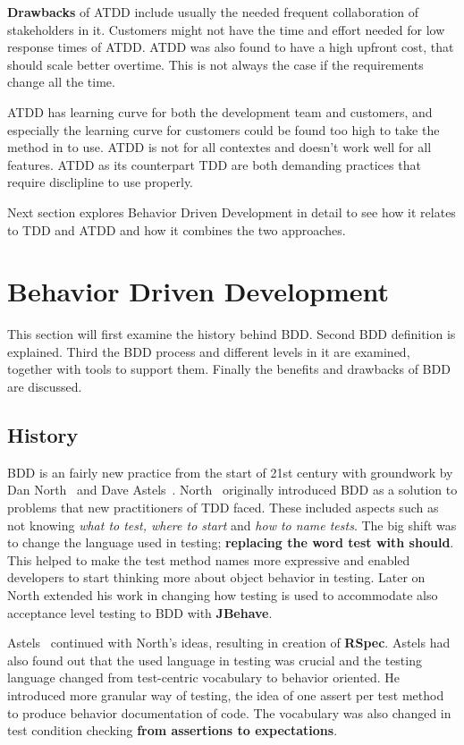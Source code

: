     \textbf{Drawbacks} of ATDD include usually the needed frequent collaboration of stakeholders in it. Customers
    might not have the time and effort needed for low response times of ATDD. ATDD was also found to have a high
    upfront cost, that should scale better overtime. This is not always the case if the requirements change all the time. ~\cite{haugset2012automated}

    ATDD has learning curve for both the development team and customers, and especially the learning curve for customers
    could be found too high to take the method in to use. ATDD is not for all contextes and doesn't work well for all features.
    ATDD as its counterpart TDD are both demanding practices that require
    disclipline to use properly.~\cite{haugset2012automated}

    Next section explores Behavior Driven Development
    in detail to see how it relates to TDD and ATDD and how it combines the two approaches.

\section{Behavior Driven Development} %
    This section will first examine the history behind BDD. Second BDD definition is explained.
    Third the BDD process and different levels in it are examined, together with tools to support them. Finally
    the benefits and drawbacks of BDD are discussed.

    \subsection{History}
    BDD is an fairly new practice from the start of 21st century with groundwork by Dan North~\cite{bdd2006north} and Dave Astels~\cite{astels2006new}.
    North~\cite{bdd2006north} originally introduced BDD as a solution to problems that new practitioners of TDD faced.
    These included aspects such as not knowing \textit{what to test, where to start} and \textit{how to name tests}. The
    big shift was to change the language used in testing; \textbf{replacing the word test with should}. This helped to make
    the test method names more expressive and enabled developers to start thinking more about object behavior in testing.
    Later on North extended his work in changing how testing is used to accommodate also acceptance level testing to BDD with \textbf{JBehave}.

    Astels~\cite{astels2006new} continued with North's ideas, resulting in creation of \textbf{RSpec}. Astels had also found
    out that the used language in testing was crucial and the testing language changed from test-centric vocabulary to behavior oriented.
    He introduced more granular way of testing, the idea of one assert per test method to produce behavior documentation of code.
    The vocabulary was also changed in test condition checking \textbf{from assertions to expectations}.

